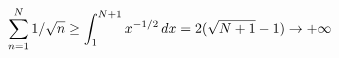 \documentclass[preview]{standalone}
\begin{document}
\begin{align*}
\special{dvisvgm:raw <g id='unique000'>}\sum_{n=1}^{N}1/\sqrt n\ge\int_1^{N+1}x^{-1/2}\,dx=2(\sqrt{N+1}-1)\to+\infty\special{dvisvgm:raw </g>}
\end{align*}
\end{document}
